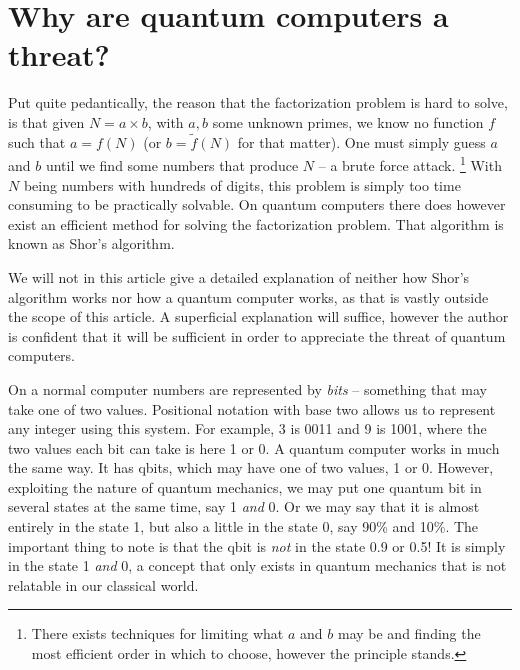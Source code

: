 \documentclass[conference]{IEEEtran}
\begin{document}
\section{Why are quantum computers a threat?}
Put quite pedantically, the reason that the factorization problem is hard to solve, is that given $N = a \times b$, with $a,b$ some unknown primes, we know no function $f$ such that $a = f(N)$ (or $b=\tilde{f}(N)$ for that matter).
One must simply guess $a$ and $b$ until we find some numbers that produce $N$ -- a brute force attack. \footnote{There exists techniques for limiting what $a$ and $b$ may be and finding the most efficient order in which to choose, however the principle stands.}
With $N$ being numbers with hundreds of digits, this problem is simply too time consuming to be practically solvable.
On quantum computers there does however exist an efficient method for solving the factorization problem.
That algorithm is known as Shor's algorithm.

We will not in this article give a detailed explanation of neither how Shor's algorithm works nor how a quantum computer works, as that is vastly outside the scope of this article.
A superficial explanation will suffice, however the author is confident that it will be sufficient in order to appreciate the threat of quantum computers.

On a normal computer numbers are represented by \emph{bits} -- something that may take one of two values.
Positional notation with base two allows us to represent any integer using this system.
For example, 3 is 0011 and 9 is 1001, where the two values each bit can take is here 1 or 0.
A quantum computer works in much the same way.
It has qbits, which may have one of two values, 1 or 0.
However, exploiting the nature of quantum mechanics, we may put one quantum bit in several states at the same time, say 1 \emph{and} 0.
Or we may say that it is almost entirely in the state 1, but also a little in the state 0, say 90\% and 10\%.
The important thing to note is that the qbit is \emph{not} in the state 0.9 or 0.5!
It is simply in the state 1 \emph{and} 0, a concept that only exists in quantum mechanics that is not relatable in our classical world.
\end{document}

